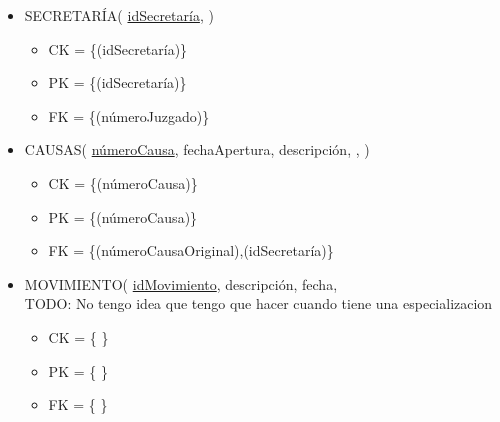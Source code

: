 \begin{itemize}
\item SECRETARÍA( \underline{idSecretaría}, )
	\begin{itemize}
		\item CK = \{(idSecretaría)\}
		\item PK = \{(idSecretaría)\}
		\item FK = \{(númeroJuzgado)\}
	\end{itemize}
	
\item CAUSAS( \underline{númeroCausa}, fechaApertura, descripción, , )
	\begin{itemize}
		\item CK = \{(númeroCausa)\}
		\item PK = \{(númeroCausa)\}
		\item FK = \{(númeroCausaOriginal),(idSecretaría)\}
	\end{itemize}
	
\item MOVIMIENTO( \underline{idMovimiento}, descripción, fecha, 
\\TODO: No tengo idea que tengo que hacer cuando tiene una especializacion 
	\begin{itemize}
		\item CK = \{ \}
		\item PK = \{ \}
		\item FK = \{ \}
	\end{itemize} 
	
	

\end{itemize}		